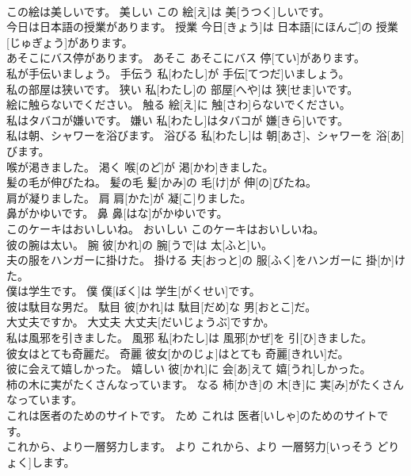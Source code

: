 \documentclass[8pt]{extreport}
\begin{document}
\begin{CJK}{UTF8}{min}
\\	この絵は美しいです。	美しい	この 絵[え]は 美[うつく]しいです。	
\\	今日は日本語の授業があります。	授業	今日[きょう]は 日本語[にほんご]の 授業[じゅぎょう]があります。	
\\	あそこにバス停があります。	あそこ	あそこにバス 停[てい]があります。	
\\	私が手伝いましょう。	手伝う	私[わたし]が 手伝[てつだ]いましょう。	
\\	私の部屋は狭いです。	狭い	私[わたし]の 部屋[へや]は 狭[せま]いです。	
\\	絵に触らないでください。	触る	絵[え]に 触[さわ]らないでください。	
\\	私はタバコが嫌いです。	嫌い	私[わたし]はタバコが 嫌[きら]いです。	
\\	私は朝、シャワーを浴びます。	浴びる	私[わたし]は 朝[あさ]、シャワーを 浴[あ]びます。	
\\	喉が渇きました。	渇く	喉[のど]が 渇[かわ]きました。	
\\	髪の毛が伸びたね。	髪の毛	髪[かみ]の 毛[け]が 伸[の]びたね。	
\\	肩が凝りました。	肩	肩[かた]が 凝[こ]りました。	
\\	鼻がかゆいです。	鼻	鼻[はな]がかゆいです。	
\\	このケーキはおいしいね。	おいしい	このケーキはおいしいね。	
\\	彼の腕は太い。	腕	彼[かれ]の 腕[うで]は 太[ふと]い。	
\\	夫の服をハンガーに掛けた。	掛ける	夫[おっと]の 服[ふく]をハンガーに 掛[か]けた。	
\\	僕は学生です。	僕	僕[ぼく]は 学生[がくせい]です。	
\\	彼は駄目な男だ。	駄目	彼[かれ]は 駄目[だめ]な 男[おとこ]だ。	
\\	大丈夫ですか。	大丈夫	大丈夫[だいじょうぶ]ですか。	
\\	私は風邪を引きました。	風邪	私[わたし]は 風邪[かぜ]を 引[ひ]きました。	
\\	彼女はとても奇麗だ。	奇麗	彼女[かのじょ]はとても 奇麗[きれい]だ。	
\\	彼に会えて嬉しかった。	嬉しい	彼[かれ]に 会[あ]えて 嬉[うれ]しかった。	
\\	柿の木に実がたくさんなっています。	なる	柿[かき]の 木[き]に 実[み]がたくさんなっています。	
\\	これは医者のためのサイトです。	ため	これは 医者[いしゃ]のためのサイトです。	
\\	これから、より一層努力します。	より	これから、より 一層努力[いっそう どりょく]します。	

\end{CJK}
\end{document}

